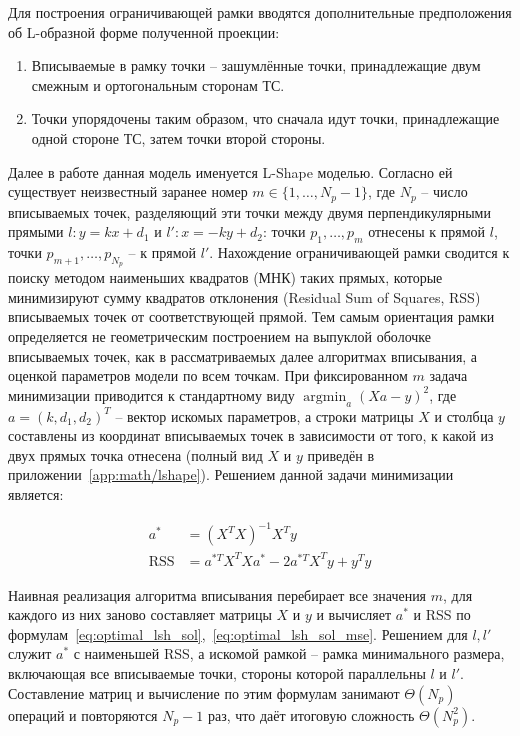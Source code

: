 Для построения ограничивающей рамки вводятся дополнительные предположения об L-образной форме полученной проекции: 

\begin{enumerate}
	\item Вписываемые в рамку точки -- зашумлённые точки, принадлежащие двум смежным и ортогональным сторонам ТС.
	\item Точки упорядочены таким образом, что сначала идут точки, принадлежащие одной стороне ТС, затем точки второй стороны.
\end{enumerate}
Далее в работе данная модель именуется L-Shape моделью. Согласно ей существует неизвестный заранее номер $m \in \{1,\dots,N_p-1\}$, где $N_p$ -- число вписываемых точек, разделяющий эти точки между двумя перпендикулярными прямыми $l: y = kx + d_1$ и $l': x = -ky+d_2$: точки $p_1,\dots,p_m$ отнесены к прямой $l$, точки $p_{m+1},\dots,p_{N_p}$ -- к прямой $l'$. Нахождение ограничивающей рамки сводится к поиску методом наименьших квадратов (МНК) таких прямых, которые минимизируют сумму квадратов отклонения (Residual Sum of Squares, RSS) вписываемых точек от соответствующей прямой. Тем самым ориентация рамки определяется не геометрическим построением на выпуклой оболочке вписываемых точек, как в рассматриваемых далее алгоритмах вписывания, а оценкой параметров модели по всем точкам. При фиксированном $m$ задача минимизации приводится к стандартному виду $\operatorname*{argmin}_{a}\left(Xa - y \right)^2$, где $a = (k, d_1, d_2)^T$ -- вектор искомых параметров, а строки матрицы $X$ и столбца $y$ составлены из координат вписываемых точек в зависимости от того, к какой из двух прямых точка отнесена (полный вид $X$ и $y$ приведён в приложении~\cref{app:math/lshape}). Решением данной задачи минимизации является:

\begin{align}
	a^* &= \left(X^TX\right)^{-1}X^Ty \label{eq:optimal_lsh_sol}\\
	\text{RSS} &= a^{*T}X^TXa^* - 2 a^{*T}X^Ty + y^Ty \label{eq:optimal_lsh_sol_mse}
\end{align}

Наивная реализация алгоритма вписывания перебирает все значения $m$, для каждого из них заново составляет матрицы $X$ и $y$ и вычисляет $a^*$ и RSS по формулам~\cref{eq:optimal_lsh_sol},~\cref{eq:optimal_lsh_sol_mse}. Решением для $l, l'$ служит $a^*$ с наименьшей RSS, а искомой рамкой -- рамка минимального размера, включающая все вписываемые точки, стороны которой параллельны $l$ и $l'$. Составление матриц и вычисление по этим формулам занимают $\Theta(N_p)$ операций и повторяются $N_p-1$ раз, что даёт итоговую сложность $\Theta(N_p^2)$.

